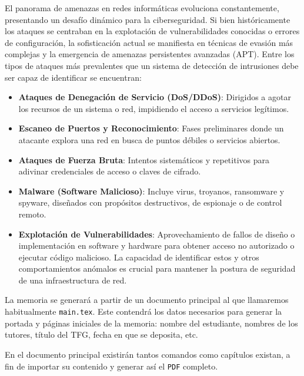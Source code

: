 El panorama de amenazas en redes informáticas evoluciona constantemente, presentando un desafío dinámico para la ciberseguridad. Si bien históricamente los ataques se centraban en la explotación de vulnerabilidades conocidas o errores de configuración, la sofisticación actual se manifiesta en técnicas de evasión más complejas y la emergencia de amenazas persistentes avanzadas (APT). Entre los tipos de ataques más prevalentes que un sistema de detección de intrusiones debe ser capaz de identificar se encuentran:
\begin{itemize}

    \item\textbf{Ataques de Denegación de Servicio (DoS/DDoS)}: Dirigidos a agotar los recursos de un sistema o red, impidiendo el acceso a servicios legítimos.
    
    \item\textbf{Escaneo de Puertos y Reconocimiento}: Fases preliminares donde un atacante explora una red en busca de puntos débiles o servicios abiertos.
    
    \item\textbf{Ataques de Fuerza Bruta}: Intentos sistemáticos y repetitivos para adivinar credenciales de acceso o claves de cifrado.
    
    \item\textbf{Malware (Software Malicioso)}: Incluye virus, troyanos, ransomware y spyware, diseñados con propósitos destructivos, de espionaje o de control remoto.
    
    \item\textbf{Explotación de Vulnerabilidades}: Aprovechamiento de fallos de diseño o implementación en software y hardware para obtener acceso no autorizado o ejecutar código malicioso.
    La capacidad de identificar estos y otros comportamientos anómalos es crucial para mantener la postura de seguridad de una infraestructura de red.

\end{itemize}
La memoria se generará a partir de un documento principal al que llamaremos habitualmente \texttt{main.tex}. Este contendrá los datos necesarios para generar la portada y páginas iniciales de la memoria: nombre del estudiante, nombres de los tutores, título del TFG, fecha en que se deposita, etc.

En el documento principal existirán tantos comandos \verb*|| como capítulos existan, a fin de importar su contenido y generar así el \verb*|PDF| completo.

